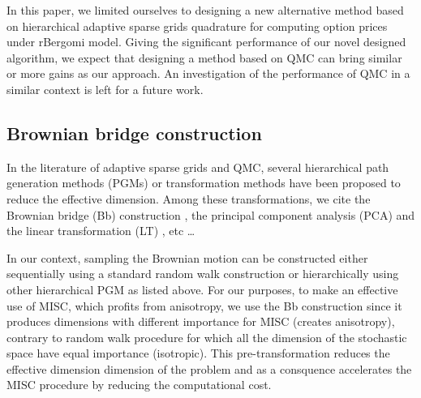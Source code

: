 \FloatBarrier


\begin{remark}
	In this paper, we limited ourselves to designing a new alternative method  based on hierarchical adaptive sparse grids quadrature for computing option prices under rBergomi model. Giving the significant performance of our novel designed algorithm, we expect that designing a method based on QMC can bring similar or more gains as  our approach. An investigation of the performance of QMC in a similar context is left for a future work.
\end{remark}



\subsection{Brownian bridge construction}\label{sec:Brwonian bridge construction}
In the literature of adaptive sparse grids and  QMC, several hierarchical path generation methods (PGMs) or transformation methods have been proposed to reduce the effective dimension. Among these transformations, we cite  the Brownian
bridge (Bb)  construction \cite{morokoff1994quasi,moskowitz1996smoothness,caflisch1997valuation}, the principal component analysis (PCA)  \cite{acworth1998comparison} and the linear transformation (LT) \cite{imai2004minimizing}, etc \dots  

In our context, sampling the Brownian motion can be constructed either sequentially using a standard random walk construction or hierarchically using   other hierarchical PGM as listed above. For our purposes, to make an effective use of MISC, which profits from anisotropy, we use the Bb construction since it produces  dimensions with different importance for MISC (creates anisotropy), contrary to random walk procedure for which all the dimension of the stochastic space have equal importance (isotropic).  This pre-transformation  reduces the effective dimension dimension  of the problem and as a consquence accelerates the MISC procedure by reducing the computational cost.


